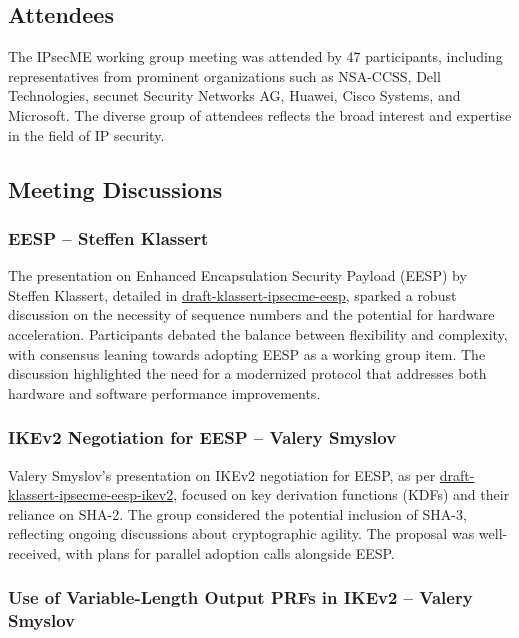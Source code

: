 \documentclass{article}
\begin{document}
\subsection{Attendees}

The IPsecME working group meeting was attended by 47 participants, including representatives from prominent organizations such as NSA-CCSS, Dell Technologies, secunet Security Networks AG, Huawei, Cisco Systems, and Microsoft. The diverse group of attendees reflects the broad interest and expertise in the field of IP security.

\subsection{Meeting Discussions}

\subsubsection{EESP – Steffen Klassert}

The presentation on Enhanced Encapsulation Security Payload (EESP) by Steffen Klassert, detailed in \href{https://datatracker.ietf.org/doc/html/draft-klassert-ipsecme-eesp}{draft-klassert-ipsecme-eesp}, sparked a robust discussion on the necessity of sequence numbers and the potential for hardware acceleration. Participants debated the balance between flexibility and complexity, with consensus leaning towards adopting EESP as a working group item. The discussion highlighted the need for a modernized protocol that addresses both hardware and software performance improvements.

\subsubsection{IKEv2 Negotiation for EESP – Valery Smyslov}

Valery Smyslov's presentation on IKEv2 negotiation for EESP, as per \href{https://datatracker.ietf.org/doc/html/draft-klassert-ipsecme-eesp-ikev2}{draft-klassert-ipsecme-eesp-ikev2}, focused on key derivation functions (KDFs) and their reliance on SHA-2. The group considered the potential inclusion of SHA-3, reflecting ongoing discussions about cryptographic agility. The proposal was well-received, with plans for parallel adoption calls alongside EESP.

\subsubsection{Use of Variable-Length Output PRFs in IKEv2 – Valery Smyslov}
\end{document}
